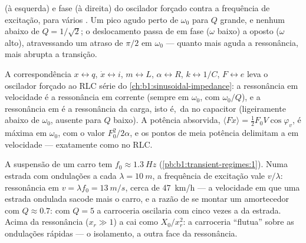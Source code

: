 \begin{omfigure}
{\small {} (à esquerda) e fase (à direita) do oscilador forçado
contra a frequência de excitação, para vários . Um pico
agudo perto de $\omega_0$ para $Q$ grande, e nenhum abaixo de $Q = 1/\sqrt2$; o
deslocamento passa de em fase ($\omega$ baixo) a oposto ($\omega$
alto), atravessando um atraso de $\pi/2$ em $\omega_0$ --- quanto mais aguda a
ressonância, mais abrupta a transição.}
\end{omfigure}

\begin{remark}\label{rem:b1:oscillators-resonance:analogy}
A correspondência $x \leftrightarrow q$, $\dot x \leftrightarrow i$,
$m \leftrightarrow L$, $\alpha \leftrightarrow R$, $k \leftrightarrow 1/C$,
$F \leftrightarrow e$ leva o oscilador forçado ao RLC série do
\cref{ch:b1:sinusoidal-impedance}: a ressonância em velocidade é a ressonância
em corrente (sempre em $\omega_0$, com  $\omega_0/Q$), e a ressonância
em  é a ressonância da carga, isto é,\ da  no capacitor (ligeiramente
abaixo de $\omega_0$, ausente para $Q$ baixo). A potência absorvida, $\langle F\dot x\rangle
= \tfrac12 F_0V\cos\varphi_v$, é máxima em $\omega_0$, com o valor $F_0^2/2\alpha$,
e os pontos de meia potência delimitam a  em velocidade --- exatamente como no
RLC.
\end{remark}

\begin{example}\label{ex:b1:oscillators-resonance:road}
A suspensão de um carro tem $f_0 \approx \qty{1.3}{Hz}$ (\cref{pb:b1:transient-regimes:1}).
Numa estrada com ondulações a cada $\lambda = \qty{10}{m}$, a frequência de
excitação vale $v/\lambda$: ressonância em $v = \lambda f_0 = \qty{13}{m/s}$,
cerca de \qty{47}{km/h} --- a velocidade em que uma estrada ondulada sacode mais o
carro, e a razão de se montar um amortecedor com $Q \approx 0.7$:
com $Q = 5$ a carroceria oscilaria com cinco vezes a  da
estrada. Acima da ressonância ($x_r \gg 1$) a  cai como
$X_0/x_r^2$: a carroceria ``flutua'' sobre as ondulações rápidas --- o isolamento, a outra
face da ressonância.
\end{example}

